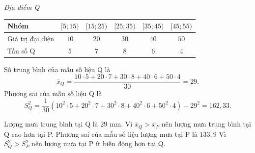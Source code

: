 \begin{ex}
{\begin{center}
\textit{Địa điểm Q}\\
\begin{tabular}{|l|c|c|c|c|c|}
\hline
Nhóm &$[5; 15)$ & $[15; 25)$ & $[25; 35)$ & $[35; 45)$ & $[45; 55)$ \\
\hline
Giá trị đại diện & $10$ & $20$ & $30$ & $40$ & $50$ \\
\hline
Tần số Q & $5$ & $7$ & $8$ & $6$ & $4$ \\
\hline
\end{tabular}
\end{center}
Số trung bình của mẫu số liệu Q là
$$ \overline{x}_Q=\dfrac{10\cdot 5 + 20\cdot 7 + 30\cdot 8 + 40\cdot 6 + 50\cdot 4}{30} = 29. $$
Phương sai của mẫu số liệu Q là
$$S^2_Q = \dfrac{1}{30} (10^2\cdot5 + 20^2\cdot7 + 30^2\cdot8 + 40^2\cdot6 + 50^2\cdot4) - 29^2 = 162{,}33.$$
\begin{itemchoice}
\itemch Lượng mưa trung bình tại Q là $29$ mm.
\itemch Vì $\overline{x}_Q>\overline{x}_P$ nên lượng mưa trung bình tại Q cao hơn tại P.
\itemch Phương sai của mẫu số liệu lượng mưa tại P là $133{,}9$
\itemch Vì $S_Q^2>S_P^2$ nên lượng mưa tại P ít biến động hơn tại Q.
\end{itemchoice}
}
\end{ex}

